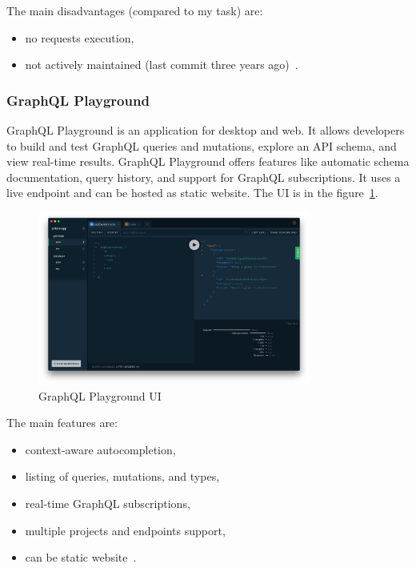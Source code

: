 The main disadvantages (compared to my task) are:
\begin{itemize}
    \item no requests execution,
    \item not actively maintained (last commit three years ago)~\cite{graphql-graphql-playground}.
\end{itemize}

\subsubsection{GraphQL Playground}
GraphQL Playground is an application for desktop and web.
It allows developers to build and test GraphQL queries and mutations, explore an API schema, and view real-time results.
GraphQL Playground offers features like automatic schema documentation, query history, and support for GraphQL subscriptions.
It uses a live endpoint and can be hosted as static website.
The UI is in the figure~\ref{fig:graphql-graphql-playground}.
\cite{graphql-graphql-playground}

\begin{figure}[hbt!]
    \centering
    \captionsetup{justification=centering}
    \includegraphics[width=0.8\textwidth]{images/graphql/graphql-playground}
    \caption{GraphQL Playground UI~\cite{graphql-graphql-playground}}
    \label{fig:graphql-graphql-playground}
\end{figure}

The main features are:
\begin{itemize}
    \item context-aware autocompletion,
    \item listing of queries, mutations, and types,
    \item real-time GraphQL subscriptions,
    \item multiple projects and endpoints support,
    \item can be static website~\cite{graphql-graphql-playground}.
\end{itemize}

